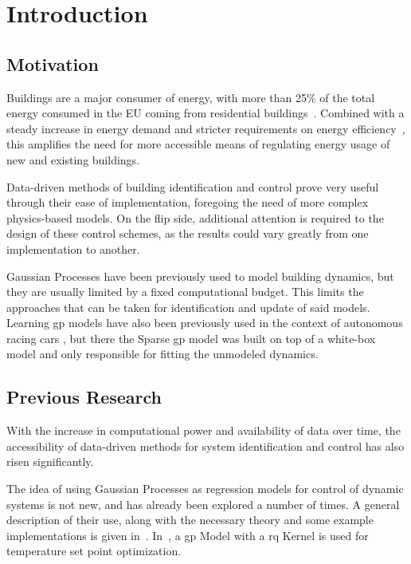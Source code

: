 \section{Introduction}

\subsection{Motivation}

Buildings are a major consumer of energy, with more than 25\% of the total
energy consumed in the EU coming from residential
buildings~\cite{tsemekiditzeiranakiAnalysisEUResidential2019}. Combined with a
steady increase in energy demand and stricter requirements on energy
efficiency~\cite{europeancommission.jointresearchcentre.EnergyConsumptionEnergy2018},
this amplifies the need for more accessible means of regulating energy usage of
new and existing buildings.

Data-driven methods of building identification and control prove very useful
through their ease of implementation, foregoing the need of more complex
physics-based models. On the flip side, additional attention is required to the
design of these control schemes, as the results could vary greatly from one
implementation to another.

Gaussian Processes have been previously used to model building dynamics, but
they are usually limited by a fixed computational budget. This limits the
approaches that can be taken for identification and update of said models.
Learning \acrshort{gp} models have also been previously used in the context of
autonomous racing cars \cite{kabzanLearningBasedModelPredictive2019}, but there
the Sparse \acrshort{gp} model was built on top of a white-box model and only
responsible for fitting the unmodeled dynamics. 

\subsection{Previous Research}
With the increase in computational power and availability of data  over time,
the accessibility of data-driven methods for system identification and control
has also risen significantly. 

The idea of using Gaussian Processes as regression models for control of dynamic
systems is not new, and has already been explored a number of times. A general
description of their use, along with the necessary theory and some example
implementations is given in~\cite{kocijanModellingControlDynamic2016}.
In~\cite{pleweSupervisoryModelPredictive2020}, a \acrlong{gp} Model with a
\acrlong{rq} Kernel is used for temperature set point optimization.

